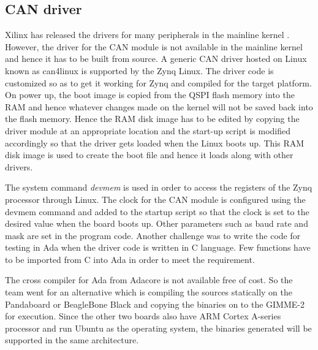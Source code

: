 \subsection{CAN driver}
Xilinx has released the drivers for many peripherals in the mainline kernel \cite{XilDrivers}. However, the driver for the CAN module is not available in the mainline kernel and hence it has to be built from source. A generic CAN driver hosted on Linux known as can4linux \cite{can4linux} is supported by the Zynq Linux. The driver code is customized so as to get it working for Zynq and compiled for the target platform. On power up, the boot image is copied from the QSPI flash memory into the RAM and hence whatever changes made on the kernel will not be saved back into the flash memory. Hence the RAM disk image has to be edited by copying the driver module at an appropriate location and the start-up script is modified accordingly so that the driver gets loaded when the Linux boots up. This RAM disk image is used to create the boot file and hence it loads along with other drivers. 

The system command \textit{devmem} is used in order to access the registers of the Zynq processor through Linux. The clock for the CAN module is configured using the devmem command and added to the startup script so that the clock is set to the desired value when the board boots up. Other parameters such as baud rate and mask are set in the program code. Another challenge was to write the code for testing in Ada when the driver code is written in C language. Few functions have to be imported from C into Ada in order to meet the requirement.

The cross compiler for Ada from Adacore is not available free of cost. So the team went for an alternative which is compiling the sources statically on the Pandaboard \cite{panda} or BeagleBone Black and copying the binaries on to the GIMME-2 for execution. Since the other two boards also have ARM Cortex A-series processor and run Ubuntu as the operating system, the binaries generated will be supported in the same architecture. 
